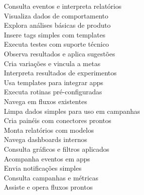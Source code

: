  Consulta eventos e interpreta relatórios\\
 Visualiza dados de comportamento\\
 Explora análises básicas de produto\\
 Insere tags simples com templates\\
[0.5em]

 Executa testes com suporte técnico\\
 Observa resultados e aplica sugestões\\
 Cria variações e vincula a metas\\
 Interpreta resultados de experimentos\\
[0.5em]

 Usa templates para integrar apps\\
 Executa rotinas pré-configuradas\\
 Navega em fluxos existentes\\
 Limpa dados simples para uso em campanhas\\
[0.5em]

 Cria painéis com conectores prontos\\
 Monta relatórios com modelos\\
 Navega dashboards internos\\
 Consulta gráficos e filtros aplicados\\
[0.5em]

 Acompanha eventos em apps\\
 Envia notificações simples\\
 Consulta campanhas e métricas\\
 Assiste e opera fluxos prontos\\
[0.5em]

